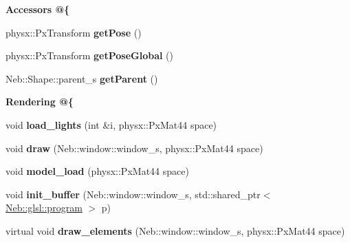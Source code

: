 \begin{Indent}{\bf \-Accessors @\{}\par
\begin{DoxyCompactItemize}
\item 
\hypertarget{classNeb_1_1Shape_1_1shape_a6b1ff7eda9f9eabe12cf5ae183ee777b}{physx\-::\-Px\-Transform {\bfseries get\-Pose} ()}\label{classNeb_1_1Shape_1_1shape_a6b1ff7eda9f9eabe12cf5ae183ee777b}

\item 
\hypertarget{classNeb_1_1Shape_1_1shape_ad2ea5bcbb4c82d19e5ca13ac5c40fb19}{physx\-::\-Px\-Transform {\bfseries get\-Pose\-Global} ()}\label{classNeb_1_1Shape_1_1shape_ad2ea5bcbb4c82d19e5ca13ac5c40fb19}

\item 
\hypertarget{classNeb_1_1Shape_1_1shape_abbb47b5c40f81653d206e7dd991a18dd}{\-Neb\-::\-Shape\-::parent\-\_\-s {\bfseries get\-Parent} ()}\label{classNeb_1_1Shape_1_1shape_abbb47b5c40f81653d206e7dd991a18dd}

\end{DoxyCompactItemize}
\end{Indent}
\begin{Indent}{\bf \-Rendering @\{}\par
\begin{DoxyCompactItemize}
\item 
\hypertarget{classNeb_1_1Shape_1_1shape_ad1ab9b88edbd6fd0e03591ff75036abb}{void {\bfseries load\-\_\-lights} (int \&i, physx\-::\-Px\-Mat44 space)}\label{classNeb_1_1Shape_1_1shape_ad1ab9b88edbd6fd0e03591ff75036abb}

\item 
\hypertarget{classNeb_1_1Shape_1_1shape_ab5ac6ec5c373da456f7c3d72b51c691f}{void {\bfseries draw} (\-Neb\-::window\-::window\-\_\-s, physx\-::\-Px\-Mat44 space)}\label{classNeb_1_1Shape_1_1shape_ab5ac6ec5c373da456f7c3d72b51c691f}

\item 
\hypertarget{classNeb_1_1Shape_1_1shape_a5fa42d964935d426ba7b0f1aa95cfc6a}{void {\bfseries model\-\_\-load} (physx\-::\-Px\-Mat44 space)}\label{classNeb_1_1Shape_1_1shape_a5fa42d964935d426ba7b0f1aa95cfc6a}

\item 
\hypertarget{classNeb_1_1Shape_1_1shape_a8df9182a4079c3a05e8df6f9f4b32676}{void {\bfseries init\-\_\-buffer} (\-Neb\-::window\-::window\-\_\-s, std\-::shared\-\_\-ptr$<$ \hyperlink{classNeb_1_1glsl_1_1program}{\-Neb\-::glsl\-::program} $>$ p)}\label{classNeb_1_1Shape_1_1shape_a8df9182a4079c3a05e8df6f9f4b32676}

\item 
\hypertarget{classNeb_1_1Shape_1_1shape_aaf7bb44f2cc26a0e151ed9993a240c07}{virtual void {\bfseries draw\-\_\-elements} (\-Neb\-::window\-::window\-\_\-s, physx\-::\-Px\-Mat44 space)}\label{classNeb_1_1Shape_1_1shape_aaf7bb44f2cc26a0e151ed9993a240c07}

\end{DoxyCompactItemize}
\end{Indent}

